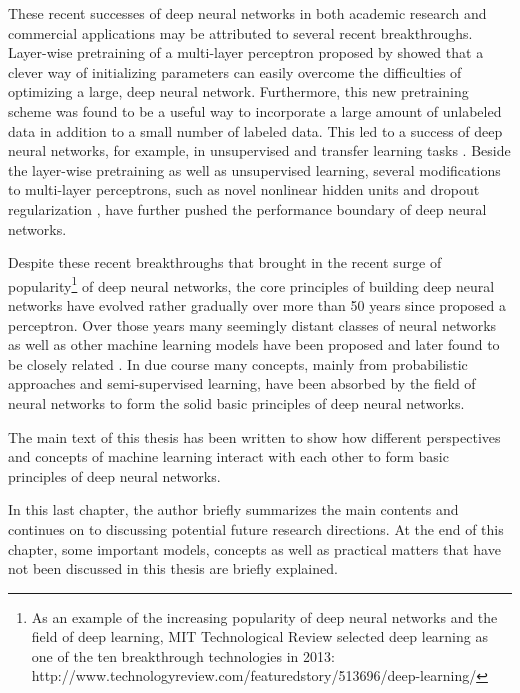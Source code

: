 \documentclass[dissertation,nocontribution,draft*]{aaltoseries}
\begin{document}
These recent successes of deep neural networks in both
academic research and commercial applications may be
attributed to several recent breakthroughs. Layer-wise
pretraining of a multi-layer perceptron proposed by
\citep{Hinton2006,Bengio2007nips,Ranzato2007} showed that a
clever way of initializing parameters can easily overcome
the difficulties of optimizing a large, deep neural network.
Furthermore, this new pretraining scheme was found to be a
useful way to incorporate a large amount of unlabeled data
in addition to a small number of labeled data. This led to a
success of deep neural networks, for example, in
unsupervised and transfer learning tasks \citep[see,
e.g.,]{Guyon2011,Mesnil2012,Raina2007}. Beside the
layer-wise pretraining as well as unsupervised learning,
several modifications to multi-layer perceptrons, such as
novel nonlinear hidden units \citep[see,
e.g.,][]{Nair2010,Glorot2011,Goodfellow2013} and dropout
regularization \citep{Hinton2012}, have further pushed the
performance boundary of deep neural networks. 

Despite these recent breakthroughs that brought in the
recent surge of popularity\footnote{As an example of the
increasing popularity of deep neural networks and the field
of deep learning, MIT Technological Review selected deep
learning as one of the ten breakthrough technologies in
2013:
\\http://www.technologyreview.com/featuredstory/513696/deep-learning/
} of deep neural networks, the core principles of building
deep neural networks have evolved rather gradually over more
than 50 years since \citet{Rosenblatt1958} proposed a
perceptron. Over those years many seemingly distant classes
of neural networks as well as other machine learning models
have been proposed and later found to be closely related
\citep[see, e.g.,][]{Haykin2009}. In due course many
concepts, mainly from probabilistic approaches and
semi-supervised learning, have been absorbed by the field of
neural networks to form the solid basic principles of deep
neural networks.

The main text of this thesis has been written to show how
different perspectives and concepts of machine learning
interact with each other to form basic principles of deep
neural networks. 

In this last chapter, the author briefly summarizes the main
contents and continues on to discussing potential future
research directions. At the end of this chapter, some
important models, concepts as well as practical matters that
have not been discussed in this thesis are briefly
explained.
\end{document}
